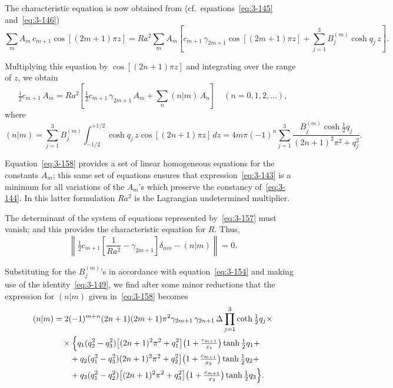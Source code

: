 The characteristic equation is now obtained from (cf.\ equations~\eqref{eq:3-145} and~\eqref{eq:3-146})
\begin{equation}\label{eq:3-156}
\sum_m A_m\, c_{m+1}\cos[(2m+1)\pi z] = Ra^2\sum_m A_m\!\left[c_{m+1}\,\gamma_{2m+1}\cos[(2m+1)\pi z] + \sum_{j=1}^{3} B_j^{(m)}\cosh q_j\, z\right].
\end{equation}

Multiplying this equation by $\cos[(2n+1)\pi z]$ and integrating over the range of $z$, we obtain
\begin{equation}\label{eq:3-157}
\tfrac{1}{2}c_{m+1}\, A_m = Ra^2\!\left[\tfrac{1}{2}c_{m+1}\,\gamma_{2m+1}\, A_m + \sum_n (n|m)\,A_n\right] \quad (n = 0,1,2,\ldots),
\end{equation}
where
\begin{equation}\label{eq:3-158}
(n|m) = \sum_{j=1}^{3} B_j^{(m)} \int_{-1/2}^{+1/2} \cosh q_j\, z\cos[(2n+1)\pi z]\,dz
= 4m\pi(-1)^n\sum_{j=1}^{3} \frac{B_j^{(m)}\cosh\tfrac{1}{2}q_j}{(2n+1)^2\pi^2 + q_j^2}.
\end{equation}

Equation~\eqref{eq:3-158} provides a set of linear homogeneous equations for the constants $A_m$; this same set of equations ensures that expression~\eqref{eq:3-143} is a minimum for all variations of the $A_m$'s which preserve the constancy of~\eqref{eq:3-144}. In this latter formulation $Ra^2$ is the Lagrangian undetermined multiplier.

The determinant of the system of equations represented by~\eqref{eq:3-157} must vanish; and this provides the characteristic equation for $R$. Thus,
\begin{equation}\label{eq:3-159}
\left\|\tfrac{1}{2}c_{m+1}\!\left[\frac{1}{Ra^2} - \gamma_{2m+1}\right]\!\delta_{mn} - (n|m)\right\| = 0.
\end{equation}

Substituting for the $B_j^{(m)}$'s in accordance with equation~\eqref{eq:3-154} and making use of the identity~\eqref{eq:3-149}, we find after some minor reductions that the expression for $(n|m)$ given in~\eqref{eq:3-158} becomes
\begin{align}
(n|m) &= 2(-1)^{m+n}(2n+1)(2m+1)\pi^2\gamma_{2m+1}\,\gamma_{2n+1}\,\Delta\prod_{j=1}^{3}\coth\tfrac{1}{2}q_j\times \notag\\
&\quad\times\Bigl\{q_1(q_2^2 - q_3^2)\bigl[(2n+1)^2\pi^2 + q_1^2\bigr]\bigl(1+\tfrac{c_{m+1}}{x_1}\bigr)\tanh\tfrac{1}{2}q_1 + \notag\\
&\qquad + q_2(q_1^2 - q_3^2)(2n+1)^2\pi^2 + q_2^2\bigr]\bigl(1+\tfrac{c_{m+1}}{x_2}\bigr)\tanh\tfrac{1}{2}q_2 + \notag\\
&\qquad + q_3(q_1^2 - q_2^2)\bigl[(2n+1)^2\pi^2 + q_3^2\bigr]\bigl(1+\tfrac{c_{m+1}}{x_3}\bigr)\tanh\tfrac{1}{2}q_3\Bigr\}. \label{eq:3-160}
\end{align}

